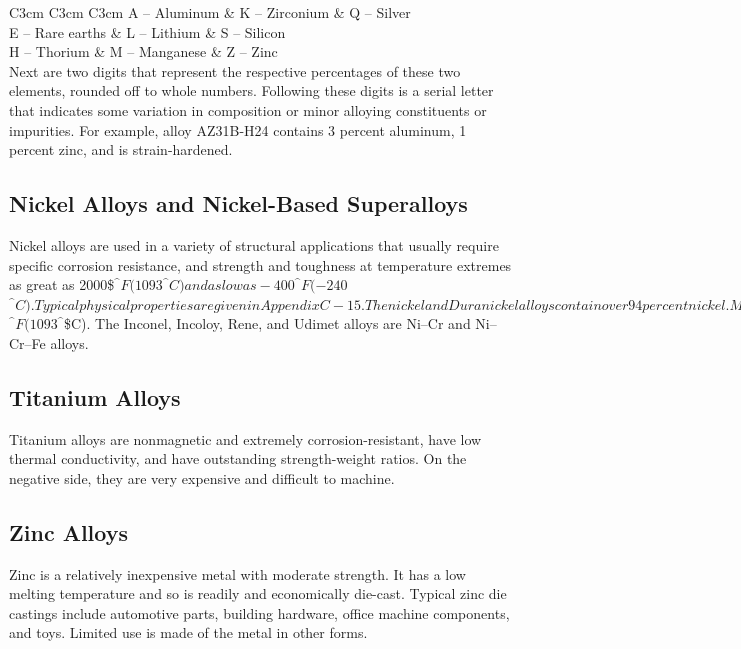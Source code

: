\documentclass[a4paper,openany,12pt]{book}
\begin{document}
 C3cm C3cm C3cm A -- Aluminum \& K -- Zirconium \& Q -- Silver\\
E -- Rare earths \& L -- Lithium \& S -- Silicon\\
H -- Thorium \& M -- Manganese \& Z -- Zinc\\

Next are two digits that represent the respective percentages of these
two elements, rounded off to whole numbers. Following these digits is a
serial letter that indicates some variation in composition or minor
alloying constituents or impurities. For example, alloy AZ31B-H24
contains 3 percent aluminum, 1 percent zinc, and is strain-hardened.

\subsection{Nickel Alloys and Nickel-Based Superalloys}
\label{sec:orgd25cb52}
Nickel alloys are used in a variety of structural applications that
usually require specific corrosion resistance, and strength and
toughness at temperature extremes as great as 2000\$\(^{\^{}} F
(1093\)\(^{\^{}} C) and as low as -400\)\(^{\^{}} F (-240\)\(^{\^{}} C). Typical
physical properties are given in Appendix C-15. The nickel and
Duranickel alloys contain over 94 percent nickel. Monel represents a
series of nickel--copper alloys, based on the mutual solubility of these
two elements in all proportions. They are strong and tough at subzero
temperatures, and especially resistant to stress corrosion cracking.
Hastelloy designates a series of Ni--Mo and Ni--Mo--Cr superalloys.
Several Hastelloys resist oxidation and maintain useful strength and
creep properties in the range of 2000\)\(^{\^{}} F (1093\)\(^{\^{}}\)\$C). The
Inconel, Incoloy, Rene, and Udimet alloys are Ni--Cr and Ni--Cr--Fe
alloys.

\subsection{Titanium Alloys}
\label{sec:org5bca98a}
Titanium alloys are nonmagnetic and extremely corrosion-resistant, have
low thermal conductivity, and have outstanding strength-weight ratios.
On the negative side, they are very expensive and difficult to machine.

\subsection{Zinc Alloys}
\label{sec:org077700a}
Zinc is a relatively inexpensive metal with moderate strength. It has a
low melting temperature and so is readily and economically die-cast.
Typical zinc die castings include automotive parts, building hardware,
office machine components, and toys. Limited use is made of the metal in
other forms.
\end{document}
